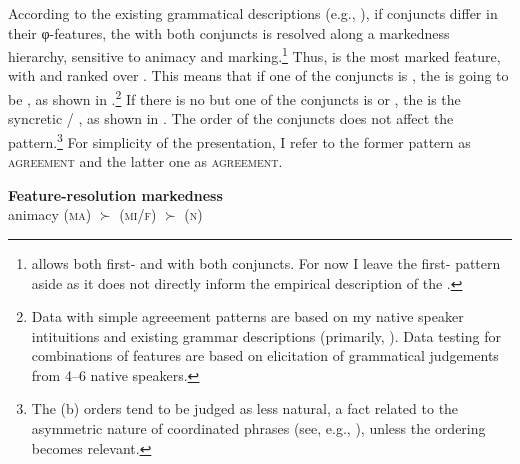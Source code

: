 \documentclass[output=paper,modfontsnewtxmath,hidelinks]{langscibook}
\begin{document}
According to the existing grammatical descriptions (e.g., \citealt{Panevova1997}), if  conjuncts differ in their φ-features, the  with both conjuncts is resolved along a markedness hierarchy, sensitive to animacy and  marking.\footnote{ allows both first-  and  with both conjuncts. For now I leave the first-  pattern aside as it does not directly inform the empirical description of the .} Thus,   is the most marked feature, with   and  ranked over . This means that if one of the conjuncts is  , the  is going to be  , as shown in .\footnote{Data with simple agreeement patterns are based on my native speaker intituitions and existing grammar descriptions (primarily, \citealt{Panevova1997,corbett83}). Data testing for combinations of features are based on elicitation of grammatical judgements from 4--6 native speakers.} If there is no    but one of the conjuncts is   or , the  is the syncretic  / , as shown in . The order of the conjuncts does not affect the  pattern.\footnote{The (b) orders tend to be judged as less natural, a fact related to the asymmetric nature of coordinated  phrases (see, e.g., \citealt{Johannessen1996}), unless the ordering becomes relevant.} For simplicity of the presentation, I refer to the former  pattern as \textsc{ agreement} and the latter one as \textsc{ agreement}. 

\ea \textbf{Feature-resolution markedness}\\
animacy (\textsc{ma}) $\succ$  ({\textsc{mi}/\textsc{f}}) $\succ$  (\textsc{n})
\z
\end{document}

